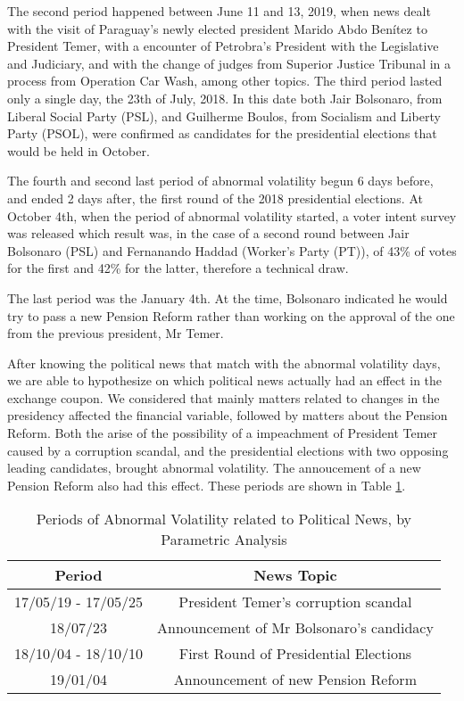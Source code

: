 \documentclass[cic,tc, english]{iiufrgs}
\begin{document}
    The second period happened between June 11 and 13, 2019, when news dealt with the visit of Paraguay's newly elected president Marido Abdo Benítez to President Temer, with a encounter of Petrobra's President with the Legislative and Judiciary, and with the change of judges from Superior Justice Tribunal in a process from Operation Car Wash, among other topics. The third period lasted only a single day, the 23th of July, 2018. In this date both Jair Bolsonaro, from Liberal Social Party (PSL), and Guilherme Boulos, from Socialism and Liberty Party (PSOL), were confirmed as candidates for the presidential elections that would be held in October.

    The fourth and second last period of abnormal volatility begun 6 days before, and ended 2 days after, the first round of the 2018 presidential elections. At October 4th, when the period of abnormal volatility started, a voter intent survey was released which result was, in the case of a second round between Jair Bolsonaro (PSL) and Fernanando Haddad (Worker's Party (PT)), of 43\% of votes for the first and 42\% for the latter, therefore a technical draw.

    The last period was the January 4th. At the time, Bolsonaro indicated he would try to pass a new Pension Reform rather than working on the approval of the one from the previous president, Mr Temer.

    After knowing the political news that match with the abnormal volatility days, we are able to hypothesize on which political news actually had an effect in the exchange coupon. We considered that mainly matters related to changes in the presidency affected the financial variable, followed by matters about the Pension Reform. Both the arise of the possibility of a impeachment of President Temer caused by a corruption scandal, and the presidential elections with two opposing leading candidates, brought abnormal volatility. The annoucement of a new Pension Reform also had this effect. These periods are shown in Table \ref{tab:respar}.

    \begin{table}[H]
        \caption{Periods of Abnormal Volatility related to Political News, by Parametric Analysis}
        \label{tab:respar}
        \centering
        \begin{tabular}{| c | c |}
            \hline
            Period & News Topic \\
            \hline \hline
            17/05/19 - 17/05/25 & President Temer's corruption scandal \\
            \hline
            18/07/23 & Announcement of Mr Bolsonaro's candidacy \\
            \hline
            18/10/04 - 18/10/10 & First Round of Presidential Elections \\
            \hline
            19/01/04 & Announcement of new Pension Reform \\
            \hline
        \end{tabular}
    \end{table}
\end{document}
